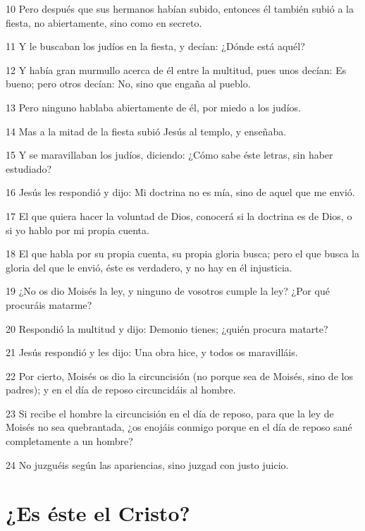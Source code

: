 \par 10 Pero después que sus hermanos habían subido, entonces él también subió a la fiesta, no abiertamente, sino como en secreto.
\par 11 Y le buscaban los judíos en la fiesta, y decían: ¿Dónde está aquél?
\par 12 Y había gran murmullo acerca de él entre la multitud, pues unos decían: Es bueno; pero otros decían: No, sino que engaña al pueblo.
\par 13 Pero ninguno hablaba abiertamente de él, por miedo a los judíos.
\par 14 Mas a la mitad de la fiesta subió Jesús al templo, y enseñaba.
\par 15 Y se maravillaban los judíos, diciendo: ¿Cómo sabe éste letras, sin haber estudiado?
\par 16 Jesús les respondió y dijo: Mi doctrina no es mía, sino de aquel que me envió.
\par 17 El que quiera hacer la voluntad de Dios, conocerá si la doctrina es de Dios, o si yo hablo por mi propia cuenta.
\par 18 El que habla por su propia cuenta, su propia gloria busca; pero el que busca la gloria del que le envió, éste es verdadero, y no hay en él injusticia.
\par 19 ¿No os dio Moisés la ley, y ninguno de vosotros cumple la ley? ¿Por qué procuráis matarme?
\par 20 Respondió la multitud y dijo: Demonio tienes; ¿quién procura matarte?
\par 21 Jesús respondió y les dijo: Una obra hice, y todos os maravilláis.
\par 22 Por cierto, Moisés os dio la circuncisión (no porque sea de Moisés, sino de los padres); y en el día de reposo circuncidáis al hombre.
\par 23 Si recibe el hombre la circuncisión en el día de reposo, para que la ley de Moisés no sea quebrantada, ¿os enojáis conmigo porque en el día de reposo sané completamente a un hombre?
\par 24 No juzguéis según las apariencias, sino juzgad con justo juicio.

\section*{¿Es éste el Cristo?}

